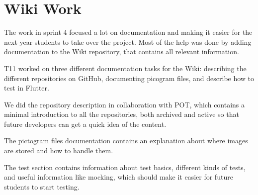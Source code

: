 \section{Wiki Work}
The work in sprint 4 focused a lot on documentation and making it easier for the next year students to take over the project. Most of the help was done by adding documentation to the Wiki repository, that contains all relevant information. 

\Gls{T11} worked on three different documentation tasks for the Wiki: describing the different repositories on GitHub, documenting picogram files, and describe how to test in Flutter. 

We did the repository description in collaboration with \gls{POT}, which contains a minimal introduction to all the repositories, both archived and active so that future developers can get a quick idea of the content.

The pictogram files documentation contains an explanation about where images are stored and how to handle them.

The test section contains information about test basics, different kinds of tests, and useful information like mocking, which should make it easier for future students to start testing.